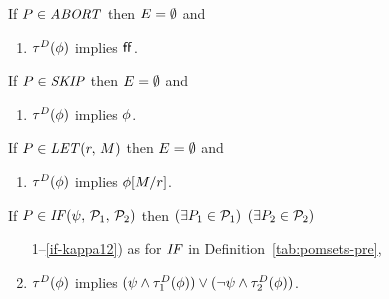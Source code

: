 \begin{definition}
  If $\aPS\SB0\in\sABORT$ then $\aEvs\SB0 = \emptyset$ and
  \begin{enumerate}
  \item $\aTr[\bEvs]\SB0(\aForm)$ implies $\FALSE$.
  \end{enumerate}

  \noindent
  If $\aPS\SB0\in\sSKIP$ then $\aEvs\SB0 = \emptyset$ and
  \begin{enumerate}
  \item $\aTr[\bEvs]\SB0(\aForm)$ implies $\aForm$.
  \end{enumerate}

  \noindent
  If $\aPS\SB0\in\sLET{\aReg}{\aExp}$ then $\aEvs\SB0 = \emptyset$ and
  \begin{enumerate}
  \item $\aTr[\bEvs]\SB0(\aForm)$ implies $\aForm[\aExp/\aReg]$.
  \end{enumerate}

  \noindent
  If $\aPS\SB0 \in \sIF{\bForm}\sTHEN\aPSS_1\sELSE\aPSS_2\sFI$ then
  $(\exists\aPS_1\in\aPSS_1)$ $(\exists\aPS_2\in\aPSS_2)$
  \begin{enumerate}
    \setcounter{enumi}{\value{pomsetPreIfCount}}
  \item[1--\ref{if-kappa12})] as for $\sIF{}$ in Definition~\ref{tab:pomsets-pre},
  \item \label{if-tau}
    $\aTr[\bEvs]\SB0(\aForm)$ implies $(\bForm\land\aTr[\bEvs%
    ]_1(\aForm))\lor(\neg\bForm\land\aTr[\bEvs%
    ]_2(\aForm))$.
  \end{enumerate}


\end{definition}

